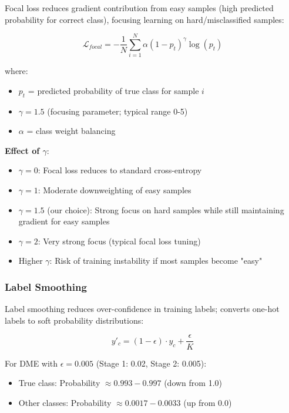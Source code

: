 Focal loss reduces gradient contribution from easy samples (high predicted probability for correct class), focusing learning on hard/misclassified samples:

\begin{equation}
\mathcal{L}_{focal} = -\frac{1}{N} \sum_{i=1}^{N} \alpha (1-p_t)^{\gamma} \log(p_t)
\end{equation}

where:
\begin{itemize}
    \item $p_t$ = predicted probability of true class for sample $i$
    \item $\gamma = 1.5$ (focusing parameter; typical range 0-5)
    \item $\alpha$ = class weight balancing
\end{itemize}

\textbf{Effect of $\gamma$}:
\begin{itemize}
    \item $\gamma = 0$: Focal loss reduces to standard cross-entropy
    \item $\gamma = 1$: Moderate downweighting of easy samples
    \item $\gamma = 1.5$ (our choice): Strong focus on hard samples while still maintaining gradient for easy samples
    \item $\gamma = 2$: Very strong focus (typical focal loss tuning)
    \item Higher $\gamma$: Risk of training instability if most samples become "easy"
\end{itemize}

\subsubsection{Label Smoothing}

Label smoothing reduces over-confidence in training labels; converts one-hot labels to soft probability distributions:

\begin{equation}
y'_c = (1 - \epsilon) \cdot y_c + \frac{\epsilon}{K}
\end{equation}

For DME with $\epsilon = 0.005$ (Stage 1: 0.02, Stage 2: 0.005):

\begin{itemize}
    \item True class: Probability $\approx 0.993-0.997$ (down from 1.0)
    \item Other classes: Probability $\approx 0.0017-0.0033$ (up from 0.0)
\end{itemize}

